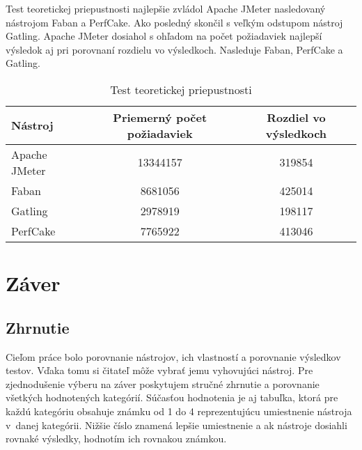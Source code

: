 \documentclass[12pt,oneside,final]{fithesis-utf8}
\begin{document}
\begin{itemize}
Test teoretickej priepustnosti najlepšie zvládol Apache JMeter nasledovaný nástrojom Faban a PerfCake. Ako posledný skončil s veľkým odstupom nástroj Gatling. Apache JMeter dosiahol s ohľadom na počet požiadaviek najlepší výsledok aj pri porovnaní rozdielu vo výsledkoch. Nasleduje Faban, PerfCake a Gatling.

\begin{table}[H]
\begin{center}
\begin{tabular}{ | l | c | c |}
		\hline
		 \textbf{Nástroj} & \textbf{Priemerný počet požiadaviek} & \textbf{Rozdiel vo výsledkoch} \\ \hline
		 Apache JMeter & 13344157 & 319854 \\ \hline
		 Faban & 8681056 & 425014 \\ \hline
		 Gatling & 2978919 & 198117 \\ \hline
		 PerfCake & 7765922 & 413046 \\ \hline
\end{tabular}
\end{center}
\caption{Test teoretickej priepustnosti}
\end{table}

\end{itemize}


\chapter{Záver}

\section{Zhrnutie}
Cieľom práce bolo porovnanie nástrojov, ich vlastností a porovnanie výsledkov testov. Vďaka tomu si čitateľ môže vybrať jemu vyhovujúci nástroj. Pre zjednodušenie výberu na záver poskytujem stručné zhrnutie a porovnanie všetkých hodnotených kategórií. Súčasťou hodnotenia je aj tabuľka, ktorá pre každú kategóriu obsahuje známku od 1 do 4 reprezentujúcu umiestnenie nástroja v~danej kategórii. Nižšie číslo znamená lepšie umiestnenie a ak nástroje dosiahli rovnaké výsledky, hodnotím ich rovnakou známkou.
\end{document}
